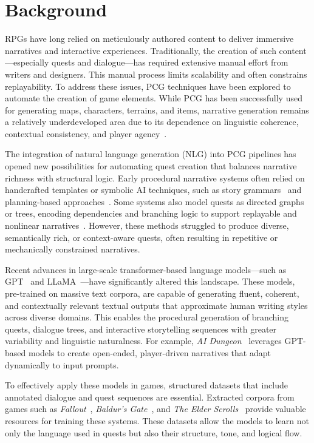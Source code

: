 \section{Background}

RPGs have long relied on meticulously authored content to deliver immersive narratives
and interactive experiences. Traditionally, the creation of such content—especially quests
and dialogue—has required extensive manual effort from writers and designers. This
manual process limits scalability and often constrains replayability. To address these
issues, PCG techniques have been explored to automate the creation of game elements.
While PCG has been successfully used for generating maps, characters, terrains, and
items, narrative generation remains a relatively underdeveloped area due to its dependence
on linguistic coherence, contextual consistency, and player agency~\cite{togelius2013procedural}.

The integration of natural language generation (NLG) into PCG pipelines has opened
new possibilities for automating quest creation that balances narrative richness with structural
logic. Early procedural narrative systems often relied on handcrafted templates or
symbolic AI techniques, such as story grammars~\cite{black1979evaluation} and planning-based approaches~\cite{riedl2013interactive}.
Some systems also model quests as directed graphs or trees, encoding dependencies and
branching logic to support replayable and nonlinear narratives~\cite{hendrikx2013procedural}. However, these methods
struggled to produce diverse, semantically rich, or context-aware quests, often resulting
in repetitive or mechanically constrained narratives.

Recent advances in large-scale transformer-based language models—such as GPT~\cite{brown2020language}
and LLaMA~\cite{touvron2023llama}—have significantly altered this landscape. These models, pre-trained
on massive text corpora, are capable of generating fluent, coherent, and contextually
relevant textual outputs that approximate human writing styles across diverse domains.
This enables the procedural generation of branching quests, dialogue trees, and interactive
storytelling sequences with greater variability and linguistic naturalness. For example, \textit{AI Dungeon}~\cite{ai-dungeon}
leverages GPT-based models to create open-ended, player-driven narratives
that adapt dynamically to input prompts.

To effectively apply these models in games, structured datasets that include annotated
dialogue and quest sequences are essential. Extracted corpora from games such as
\textit{Fallout}~\cite{fallout1,fallout2}, \textit{Baldur's Gate}~\cite{baldursgate,baldursgate2shadowsofamn}, and \textit{The Elder Scrolls}~\cite{theelderscrollsivoblivion,theelderscrollsvskyrim} provide valuable
resources for training these systems. These datasets allow the models to learn not only
the language used in quests but also their structure, tone, and logical flow.

